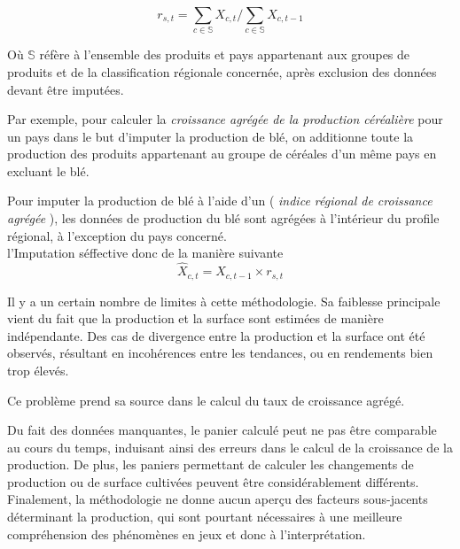 \documentclass[nojss]{jss}\usepackage{graphicx, color}
\begin{document}
\begin{equation}
  \label{eq:aggregateGrowth}
  r_{s, t} = \sum_{c \in \mathbb{S}} X_{c, t}/\sum_{c \in \mathbb{S}} X_{c, t-1}
\end{equation}

O\`{u} $\mathbb{S}$ r\'{e}f\`{e}re \`{a} l'ensemble des produits et
pays appartenant aux groupes de produits et de la classification
r\'{e}gionale concern\'{e}e, apr\`{e}s exclusion des donn\'{e}es
devant \^{e}tre imput\'{e}es.


Par exemple, pour calculer la \textit{croissance agr\'{e}g\'{e}e de la
  production c\'{e}r\'{e}ali\`{e}re} pour un pays dans le but
d'imputer la production de bl\'{e}, on additionne toute la production
des produits appartenant au groupe de c\'{e}r\'{e}ales d'un m\^{e}me pays
en excluant le bl\'{e}.

Pour imputer la production de bl\'{e} \`{a} l'aide d'un (\textit{
  indice r\'{e}gional de croissance agr\'{e}g\'{e}e }), les
donn\'{e}es de production du bl\'{e} sont agr\'{e}g\'{e}es \`{a}
l'int\'{e}rieur du profile r\'{e}gional, \`{a} l'exception du pays
concern\'{e}. \\


l'Imputation s\'{e}ffective donc de la mani\`{e}re suivante
\begin{equation}
  \hat{X}_{c, t} = X_{c, t-1} \times r_{s, t}
\end{equation}
  
Il y a un certain nombre de limites \`{a} cette m\'{e}thodologie. Sa
faiblesse principale vient du fait que la production et la surface
sont estim\'{e}es de mani\`{e}re ind\'{e}pendante. Des cas de
divergence entre la production et la surface ont \'{e}t\'{e}
observ\'{e}s, r\'{e}sultant en incoh\'{e}rences entre les tendances,
ou en rendements bien trop \'{e}lev\'{e}s.


Ce probl\`{e}me prend sa source dans le calcul du taux de croissance
agr\'{e}g\'{e}.

Du fait des donn\'{e}es manquantes, le panier calcul\'{e} peut ne pas
\^{e}tre comparable au cours du temps, induisant ainsi des erreurs
dans le calcul de la croissance de la production. De plus, les paniers
permettant de calculer les changements de production ou de surface
cultiv\'{e}es peuvent \^{e}tre consid\'{e}rablement
diff\'{e}rents. Finalement, la m\'{e}thodologie ne donne aucun
aper\c{c}u des facteurs sous-jacents d\'{e}terminant la production,
qui sont pourtant n\'{e}cessaires \`{a} une meilleure
compr\'{e}hension des ph\'{e}nom\`{e}nes en jeux et donc \`{a}
l'interpr\'{e}tation.
\end{document}
